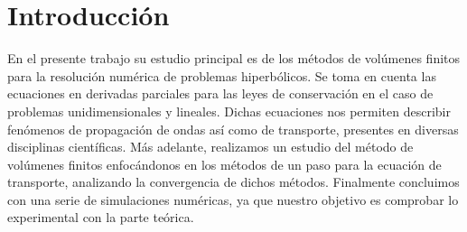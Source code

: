 \chapter*{Introducción}

En el presente trabajo su estudio principal es de los métodos de
volúmenes finitos para la resolución numérica de problemas
hiperbólicos.
Se toma en cuenta las ecuaciones en derivadas parciales para las
leyes de conservación en el caso de problemas unidimensionales y
lineales.
Dichas ecuaciones nos permiten describir fenómenos de propagación de
ondas así como de transporte, presentes en diversas disciplinas
científicas.
Más adelante, realizamos un estudio del método de volúmenes finitos
enfocándonos en los métodos de un paso para la ecuación de
transporte, analizando la convergencia de dichos métodos.
Finalmente concluimos con una serie de simulaciones numéricas, ya que
nuestro objetivo es comprobar lo experimental con la parte teórica.